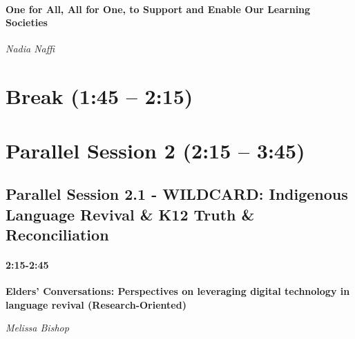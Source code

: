\documentclass[
]{book}
\begin{document}
\begin{wp}
\hypertarget{one-for-all-all-for-one-to-support-and-enable-our-learning-societies}{%
\paragraph{\texorpdfstring{\textbf{One for All, All for One, to Support
and Enable Our Learning
Societies}}{One for All, All for One, to Support and Enable Our Learning Societies}}\label{one-for-all-all-for-one-to-support-and-enable-our-learning-societies}}

\emph{Nadia Naffi}
\end{wp}

\hypertarget{break-145-215}{%
\section*{Break (1:45 -- 2:15)}\label{break-145-215}}

\hypertarget{parallel-session-2-215-345}{%
\section*{Parallel Session 2 (2:15 -- 3:45)}\label{parallel-session-2-215-345}}

\hypertarget{parallel-session-2.1---wildcard-indigenous-language-revival-k12-truth-reconciliation}{%
\subsection*{Parallel Session 2.1 - WILDCARD: Indigenous Language Revival \& K12 Truth \& Reconciliation}\label{parallel-session-2.1---wildcard-indigenous-language-revival-k12-truth-reconciliation}}

\begin{secondary}
\hypertarget{section}{%
\paragraph{2:15-2:45}\label{section}}

\textbf{Elders' Conversations: Perspectives on leveraging digital
technology in language revival (Research-Oriented)}

\emph{Melissa Bishop}
\end{secondary}
\end{document}
